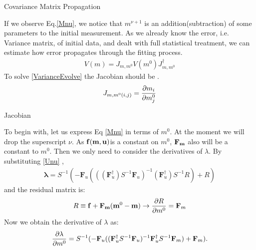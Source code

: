 \documentclass[
	xcolor=dvipsnames,
	aspectratio=169,	
	10pt, 
	]{beamer}
\begin{document}
\begin{frame}{Covariance Matrix Propagation}
	\begin{block}{}
		If we observe Eq.\eqref{Mnu}, we notice that $m^{\nu+1} $ is an addition(subtraction) of some parameters to the initial measurement. As we already know the error, i.e. Variance matrix, of initial data, and dealt with full statistical treatment, we can estimate how error propagates through the fitting process. 
		\begin{align}
			V(m) = J_{m,m^0}V(m^0)J_{m,m^0}^\dagger\label{VarianceEvolve}
		\end{align}
		To solve \eqref{VarianceEvolve} the Jacobian should be .
		\begin{align}
			J_{m,m^0(i,j)} = \frac{\partial m_i}{\partial m^0_j}\label{Jacobian}
		\end{align}
	\end{block}
\end{frame}
\begin{frame}{Jacobian}
	\begin{block}{}
		To begin with, let us express Eq \eqref{Mnu} in terms of $m^0$. At the moment we will drop the superscript $\nu$. As $\mathbf{f}(\mathbf{m},\mathbf{u})$is a constant on $m^0$, $\mathbf{F}_{\mathbf{m}}$ also will be a constant to $m^0$. Then we only need to consider the derivatives of $\lambda$. By substituting \eqref{Unu} ,
		\begin{align}
	\mathbf\lambda = S^{-1}(-\mathbf F_u(((\mathbf{F}_u^\dagger) S^{-1}\mathbf F_u)^{-1}(\mathbf{F}_u^\dagger) S^{-1}R) + R)
		\end{align}
		and the residual matrix is:
		\begin{align}
			R\equiv \mathbf f + \mathbf{F}_\mathbf{m}(\mathbf{m}^0-\mathbf{m})\to \frac{\partial R}{\partial m^0}= \mathbf{F}_m
		\end{align} 
		Now we obtain the derivative of $\lambda$ as:
		\begin{align}
			\frac{\partial \lambda}{\partial m^0}= S^{-1}(-\mathbf F_u((\mathbf{F}_u^\dagger S^{-1}\mathbf F_u)^{-1}\mathbf{F}_u^\dagger S^{-1}\mathbf{F}_m) + \mathbf{F}_m).
		\end{align}
	\end{block}
\end{frame}
\end{document}
